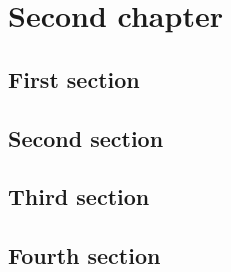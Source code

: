 \chapter{Second chapter}

\section{First section}\lipsum
\section{Second section}\lipsum
\section{Third section}\cite{2019sf2a.conf..447L}\lipsum
\section{Fourth section}\lipsum





